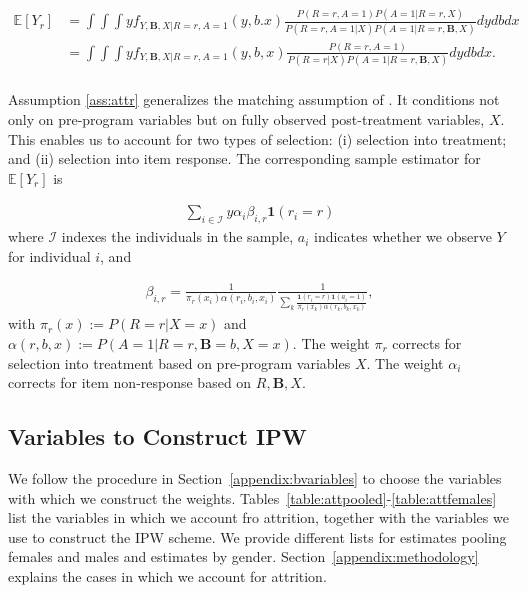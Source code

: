 \begin{align*} \label{eq:case2ipw}
\mathbb{E}[Y_r] & = \int \int \int y f_{Y,\bm{B},X|R=r,A=1}(y,b.x) \frac{P(R=r,A=1) P(A=1|R=r,X)}{P(R=r,A=1|X) P(A=1|R=r,\bm{B},X)} dydbdx \\
	            & = \int \int  \int y f_{Y,\bm{B},X|R=r,A=1}(y,b,x) \frac{P(R=r,A=1)}{P(R=r|X) P(A=1|R=r,\bm{B},X)} dydbdx. \\
\end{align*}

\noindent Assumption \ref{ass:attr} generalizes the matching assumption of \citet{Campbell_Conti_etal_2014_EarlyChildhoodInvestments}. It conditions not only on pre-program variables but on fully observed post-treatment variables, $X$. This enables us to account for two types of selection:  (i) selection into treatment; and (ii) selection into item response. The corresponding sample estimator for $\mathbb{E}[Y_r]$ is

\begin{align*}
\sum_{i \in \mathcal{I}} y \alpha_{i} \beta_{i,r} \mathbf{1}(r_i = r)
\end{align*}
\noindent where $\mathcal{I}$ indexes the individuals in the sample, $a_i$ indicates whether we observe $Y$ for individual $i$, and

\begin{align*}
	\beta_{i,r} = \frac{1}{\pi_r(x_i) \alpha(r_i,b_i,x_i)} \frac{1}{\sum_k{\frac{\mathbf{1}(r_i = r) \mathbf{1}(a_i = 1)}{\pi_r(x_k)\alpha(r_k,b_k,x_k)}}},
\end{align*}
\noindent with $\pi_r(x) := P(R=r|X=x)$ and $\alpha(r,b,x) := P(A=1|R=r,\bm{B}=b,X=x)$. The weight $\pi_r$ corrects for selection into treatment based on pre-program variables $X$. The weight $\alpha_{i}$ corrects for item non-response based on $R, \bm{B}, X$.\\

\subsection{Variables to Construct IPW}

\noindent We follow the procedure in Section~\ref{appendix:bvariables} to choose the variables with which we construct the weights. Tables~\ref{table:attpooled}-\ref{table:attfemales} list the variables in which we account fro attrition, together with the variables we use to construct the IPW scheme. We provide different lists for estimates pooling females and males and estimates by gender. Section~\ref{appendix:methodology} explains the cases in which we account for attrition.

